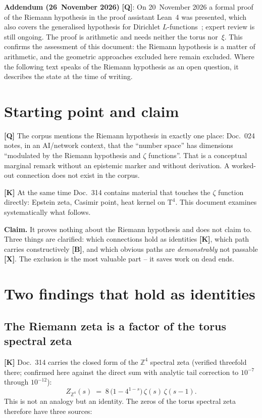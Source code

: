 \noindent\textbf{Addendum (26~November 2026)} \textbf{[Q]}: On 20~November 2026
a formal proof of the Riemann hypothesis in the proof assistant Lean~4 was
presented, which also covers the generalised hypothesis for Dirichlet
$L$-functions~\cite{alpoege2026}; expert review is still ongoing. The proof is
arithmetic and needs neither the torus nor~$\xi$. This confirms the assessment
of this document: the Riemann hypothesis is a matter of arithmetic, and the
geometric approaches excluded here remain excluded. Where the following text
speaks of the Riemann hypothesis as an open question, it describes the state at
the time of writing.

\section{Starting point and claim}

\textbf{[Q]} The corpus mentions the Riemann hypothesis in exactly one
place: Doc.~024 notes, in an AI/network context, that the
\enquote{number space} has dimensions \enquote{modulated by the Riemann
hypothesis and $\zeta$ functions}. That is a conceptual marginal remark
without an epistemic marker and without derivation. A worked-out
connection does not exist in the corpus.

\textbf{[K]} At the same time Doc.~314 contains material that touches
the $\zeta$ function directly: Epstein zeta, Casimir point, heat kernel
on $\text{T}^4$. This document examines systematically what follows.

\textbf{Claim.} It proves nothing about the Riemann hypothesis and does
not claim to. Three things are clarified: which connections hold as
identities \textbf{[K]}, which path carries constructively \textbf{[B]},
and which obvious paths are \emph{demonstrably} not passable
\textbf{[X]}. The exclusion is the most valuable part -- it saves work
on dead ends.

\section{Two findings that hold as identities}
\label{sec:faktor}

\subsection{The Riemann zeta is a factor of the torus spectral zeta}

\textbf{[K]} Doc.~314 carries the closed form of the $\mathbb{Z}^4$
spectral zeta (verified threefold there; confirmed here against the
direct sum with analytic tail correction to $10^{-7}$ through
$10^{-12}$):
\[
  Z_{\mathbb{Z}^4}(s) \;=\; 8\,\bigl(1 - 4^{1-s}\bigr)\,
  \zeta(s)\,\zeta(s-1).
\]
This is not an analogy but an identity. The zeros of the torus spectral
zeta therefore have three sources:

